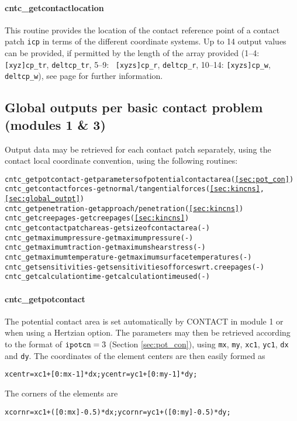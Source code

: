 \documentclass[12pt]{report}
\begin{document}
\paragraph{cntc\_getcontactlocation}

This routine provides the location of the contact reference point of a
contact patch {\tt icp} in terms of the different coordinate systems. Up to
14 output values can be provided, if permitted by the length of the array
provided (1--4: {\tt [xyz]cp\_tr}, {\tt deltcp\_tr}, 5--9: {\tt
[xyzs]cp\_r}, {\tt deltcp\_r}, 10--14: {\tt [xyzs]cp\_w}, {\tt deltcp\_w}),
see page \pageref{pg:contact_refpos} for further information.

\subsection{Global outputs per basic contact problem (modules 1 \& 3)}
\label{sec:global_output3}

Output data may be retrieved for each contact patch separately, using the
contact local coordinate convention, using the following routines:
\begin{alltt}\small
cntc_getpotcontact         - get parameters of potential contact area (\ref{sec:pot_con})
cntc_getcontactforces      - get normal/tangential forces (\ref{sec:kincns}, \ref{sec:global_outpt})
cntc_getpenetration        - get approach/penetration (\ref{sec:kincns})
cntc_getcreepages          - get creepages (\ref{sec:kincns})
cntc_getcontactpatchareas  - get size of contact area (-)
cntc_getmaximumpressure    - get maximum pressure (-)
cntc_getmaximumtraction    - get maximum shear stress (-)
cntc_getmaximumtemperature - get maximum surface temperatures (-)
cntc_getsensitivities      - get sensitivities of forces wrt. creepages (-)
cntc_getcalculationtime    - get calculation time used (-)
\end{alltt}

\paragraph{cntc\_getpotcontact}

The potential contact area is set automatically by CONTACT in module 1 or
when using a Hertzian option. The parameters may then be retrieved
according to the format of ${\tt ipotcn}=3$ (Section \ref{sec:pot_con}),
using {\tt mx}, {\tt my}, {\tt xc1}, {\tt yc1}, {\tt dx} and {\tt dy}. The
coordinates of the element centers are then easily formed as
\begin{alltt}\small
  xcentr = xc1 +  [0:mx-1] * dx;     ycentr = yc1 +  [0:my-1] * dy;
\end{alltt}
The corners of the elements are
\begin{alltt}\small
  xcornr = xc1 + ([0:mx]-0.5) * dx;  ycornr = yc1 + ([0:my]-0.5) * dy;
\end{alltt}
\end{document}
